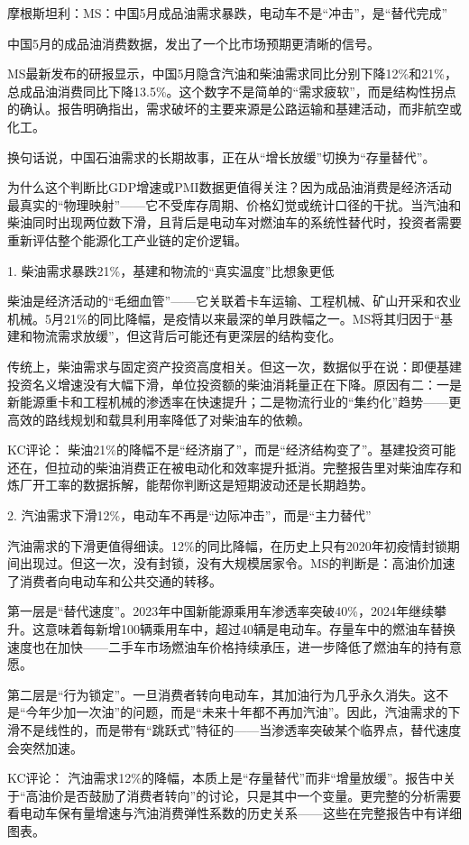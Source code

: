 \documentclass[11pt]{ctexart}
\begin{document}
摩根斯坦利：MS：中国5月成品油需求暴跌，电动车不是“冲击”，是“替代完成”

中国5月的成品油消费数据，发出了一个比市场预期更清晰的信号。

MS最新发布的研报显示，中国5月隐含汽油和柴油需求同比分别下降12\%和21\%，总成品油消费同比下降13.5\%。这个数字不是简单的“需求疲软”，而是结构性拐点的确认。报告明确指出，需求破坏的主要来源是公路运输和基建活动，而非航空或化工。

换句话说，中国石油需求的长期故事，正在从“增长放缓”切换为“存量替代”。

为什么这个判断比GDP增速或PMI数据更值得关注？因为成品油消费是经济活动最真实的“物理映射”——它不受库存周期、价格幻觉或统计口径的干扰。当汽油和柴油同时出现两位数下滑，且背后是电动车对燃油车的系统性替代时，投资者需要重新评估整个能源化工产业链的定价逻辑。

1. 柴油需求暴跌21\%，基建和物流的“真实温度”比想象更低

柴油是经济活动的“毛细血管”——它关联着卡车运输、工程机械、矿山开采和农业机械。5月21\%的同比降幅，是疫情以来最深的单月跌幅之一。MS将其归因于“基建和物流需求放缓”，但这背后可能还有更深层的结构变化。

传统上，柴油需求与固定资产投资高度相关。但这一次，数据似乎在说：即便基建投资名义增速没有大幅下滑，单位投资额的柴油消耗量正在下降。原因有二：一是新能源重卡和工程机械的渗透率在快速提升；二是物流行业的“集约化”趋势——更高效的路线规划和载具利用率降低了对柴油车的依赖。

KC评论： 柴油21\%的降幅不是“经济崩了”，而是“经济结构变了”。基建投资可能还在，但拉动的柴油消费正在被电动化和效率提升抵消。完整报告里对柴油库存和炼厂开工率的数据拆解，能帮你判断这是短期波动还是长期趋势。

2. 汽油需求下滑12\%，电动车不再是“边际冲击”，而是“主力替代”

汽油需求的下滑更值得细读。12\%的同比降幅，在历史上只有2020年初疫情封锁期间出现过。但这一次，没有封锁，没有大规模居家令。MS的判断是：高油价加速了消费者向电动车和公共交通的转移。

第一层是“替代速度”。2023年中国新能源乘用车渗透率突破40\%，2024年继续攀升。这意味着每新增100辆乘用车中，超过40辆是电动车。存量车中的燃油车替换速度也在加快——二手车市场燃油车价格持续承压，进一步降低了燃油车的持有意愿。

第二层是“行为锁定”。一旦消费者转向电动车，其加油行为几乎永久消失。这不是“今年少加一次油”的问题，而是“未来十年都不再加汽油”。因此，汽油需求的下滑不是线性的，而是带有“跳跃式”特征的——当渗透率突破某个临界点，替代速度会突然加速。

KC评论： 汽油需求12\%的降幅，本质上是“存量替代”而非“增量放缓”。报告中关于“高油价是否鼓励了消费者转向”的讨论，只是其中一个变量。更完整的分析需要看电动车保有量增速与汽油消费弹性系数的历史关系——这些在完整报告中有详细图表。
\end{document}

